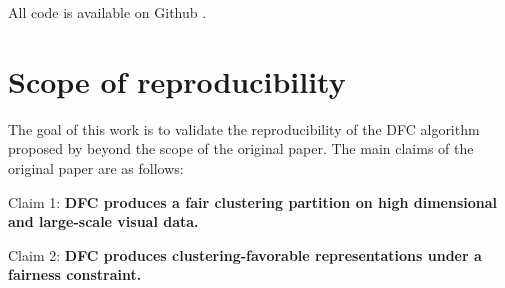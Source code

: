 All code is available on Github \citep{onze_git}. 


\section{Scope of reproducibility}
\label{sec:claims}




The goal of this work is to validate the reproducibility of the DFC algorithm proposed by  \citet{Li_2020_CVPR} beyond the scope of the original paper. The main claims of the original paper are as follows:

\begin{displayquote}
    Claim 1:
    \textbf{DFC produces a fair clustering partition on high dimensional and large-scale visual data.}
\end{displayquote}
\begin{displayquote}
    Claim 2:
    \textbf{DFC produces clustering-favorable representations under a fairness constraint.}
    \end{displayquote}
    
